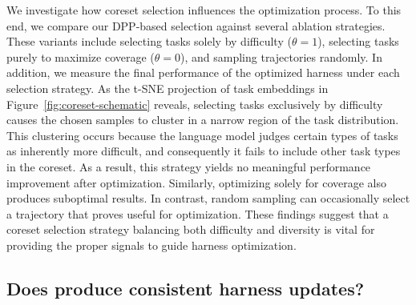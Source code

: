  We investigate how coreset selection influences the optimization process.
To this end, we compare our DPP-based selection against several ablation strategies.
These variants include selecting tasks solely by difficulty ($\theta=1$), selecting tasks purely to maximize coverage ($\theta=0$), and sampling trajectories randomly.
In addition, we measure the final performance of the optimized harness under each selection strategy.
As the t-SNE projection of task embeddings in Figure~\ref{fig:coreset-schematic} reveals, selecting tasks exclusively by difficulty causes the chosen samples to cluster in a narrow region of the task distribution.
This clustering occurs because the language model judges certain types of tasks as inherently more difficult, and consequently it fails to include other task types in the coreset.
As a result, this strategy yields no meaningful performance improvement after optimization.
Similarly, optimizing solely for coverage also produces suboptimal results.
In contrast, random sampling can occasionally select a trajectory that proves useful for optimization.
These findings suggest that a coreset selection strategy balancing both difficulty and diversity is vital for providing the proper signals to guide harness optimization.

\subsection{Does \method{} produce consistent harness updates?}
\label{sec:disc-consistency}

